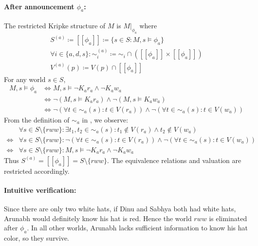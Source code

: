 \paragraph*{After announcement \(\phi_{a}\):} 
The restricted Kripke structure of \(M\) is \(M|_{\phi_{a}}\) where
\begin{gather*}
    S^{(a)} \coloneqq [\![ \phi_{a} ]\!] \coloneqq 
        \{ s \in S : M,s \models \phi_{a}\} \\
    \forall i \in \{a,d,s\}: \sim_{i}^{(a)} \coloneqq 
        \sim_{i} \cap ([\![ \phi_{a} ]\!] \times [\![ \phi_{a} ]\!]) \\
    V^{(a)}(p) \coloneqq V(p) \cap [\![ \phi_{a} ]\!]
\end{gather*}
For any world \(s \in S\),
\begin{align*}
    M,s \models \phi_{a} 
        &\iff M,s \models \neg K_{a}r_{a} \land \neg K_{a}w_{a} \\
        &\iff \neg(M,s \models K_{a}r_{a}) \land \neg(M,s \models K_{a}w_{a}) \\
        &\iff \neg(\forall t \in \sim_{a}(s): t \in V(r_{a}))
            \land \neg(\forall t \in \sim_{a}(s): t \in V(w_{a})) \tag{1.1(b2)}\label{eq:1.1(b2)}
\end{align*}
From the definition of \(\sim_{a}\) in , we observe:
\begin{align*}
    &\forall s \in S \setminus \{rww\}:
        \exists t_{1},t_{2} \in \sim_{a}(s):
            t_{1} \not\in V(r_{a}) \land t_{2} \not\in V(w_{a}) \\
    \iff &\forall s \in S \setminus \{rww\}:
        \neg(\forall t \in \sim_{a}(s): t \in V(r_{a}))
        \land \neg(\forall t \in \sim_{a}(s): t \in V(w_{a})) \\
    \iff &\forall s \in S \setminus \{rww\}:
        M,s \models \neg K_{a}r_{a} \land \neg K_{a}w_{a} \tag{1.1(b3)}\label{eq:1.1(b3)}
\end{align*}
Thus \( S^{(a)} = [\![ \phi_{a} ]\!] = S \setminus \{rww\}\). 
The equivalence relations and valuation are restricted accordingly.

\paragraph{Intuitive verification:} Since there are only two white hats, 
if Dinu and Sabhya both had white hats, Arunabh would definitely 
know his hat is red. Hence the world \(rww\) is eliminated after 
\(\phi_{a}\). In all other worlds, Arunabh lacks sufficient 
information to know his hat color, so they survive.


